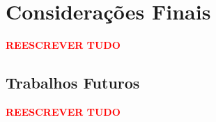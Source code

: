\chapter{Considerações Finais}\label{consideracoesFinais}

\textcolor{red}{\textbf{REESCREVER TUDO}}





\section{Trabalhos Futuros}

\textcolor{red}{\textbf{REESCREVER TUDO}}


